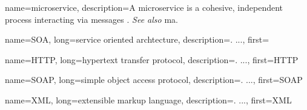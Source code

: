 {
    name=microservice,
    description={A microservice is a cohesive, independent process interacting
    via messages \autocite{Dragoni_etal_2017}. \textit{See also} \gls{ma}.} %
}

{
    name=SOA,
    long={service oriented archtecture},
    description={. ...},%
    first=
}

{
    name=HTTP,
    long={hypertext transfer protocol},
    description={. ...},%
    first=HTTP %
}

{
    name=SOAP,
    long={simple object access protocol},
    description={. ...},%
    first=SOAP
}

{
    name=XML,
    long={extensible markup language},
    description={. ...},%
    first=XML
}